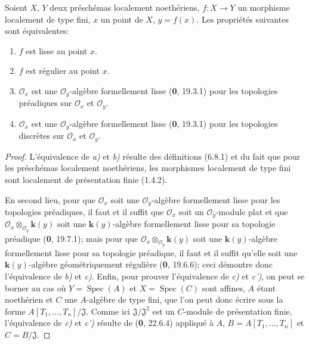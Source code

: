 \begin{theorem}[6.8.6]
\label{IV.2.s6.8.6-fr}
Soient $X$, $Y$ deux préschémas localement noethériens, $f:X\to Y$ un
morphisme localement de type fini, $x$ un point de $X$, $y=f(x)$. Les
propriétés suivantes sont équivalentes:
\begin{enumerate}
\item[\textup{a)}] $f$ est lisse au point $x$.
\item[\textup{b)}] $f$ est régulier au point $x$.
\item[\textup{c)}] $\mathcal O_x$ est une $\mathcal O_y$-algèbre formellement lisse
\textup{(\textbf{0}, 19.3.1)} pour les topologies préadiques sur $\mathcal O_x$ et $\mathcal O_y$.
\item[\textup{c')}] $\mathcal O_x$ est une $\mathcal O_y$-algèbre formellement lisse
\textup{(\textbf{0}, 19.3.1)} pour les topologies discrètes sur $\mathcal O_x$ et $\mathcal O_y$.
\end{enumerate}
\end{theorem}

\begin{proof}
L'équivalence de \emph{a)} et \emph{b)} résulte des définitions (6.8.1) et du fait que
pour les préschémas localement noethériens, les morphismes localement de type
fini sont localement de présentation finie (1.4.2).

En second lieu, pour que
$\mathcal O_x$ soit une $\mathcal O_y$-algèbre formellement lisse pour les
topologies préadiques, il faut et il suffit que $\mathcal O_x$ soit un
$\mathcal O_y$-module plat et que $\mathcal O_x\otimes_{\mathcal O_y}\boldsymbol{k}(y)$
soit une $\boldsymbol{k}(y)$-algèbre formellement lisse pour sa topologie préadique
(\textbf{0}, 19.7.1); mais pour que $\mathcal O_x\otimes_{\mathcal O_y}\boldsymbol{k}(y)$ soit une $\boldsymbol{k}(y)$-algèbre formellement lisse pour sa topologie préadique,
il faut et il suffit qu'elle soit une $\boldsymbol{k}(y)$-algèbre géométriquement régulière
(\textbf{0}, 19.6.6); ceci démontre donc l'équivalence de \emph{b)} et \emph{c)}. Enfin, pour prouver
l'équivalence de \emph{c)} et \emph{c')}, on peut se borner au cas où $Y=\operatorname{Spec}(A)$
et $X=\operatorname{Spec}(C)$ sont affines, $A$ étant noethérien et $C$ une
$A$-algèbre de type fini, que l'on peut donc écrire sous la forme
$A[T_1,\ldots,T_n]/\mathfrak J$. Comme ici $\mathfrak J/\mathfrak J^2$ est un
$C$-module de présentation finie, l'équivalence de \emph{c)} et \emph{c')} résulte de
(\textbf{0}, 22.6.4) appliqué à $A$, $B=A[T_1,\ldots,T_n]$ et $C=B/\mathfrak J$.
\end{proof}

